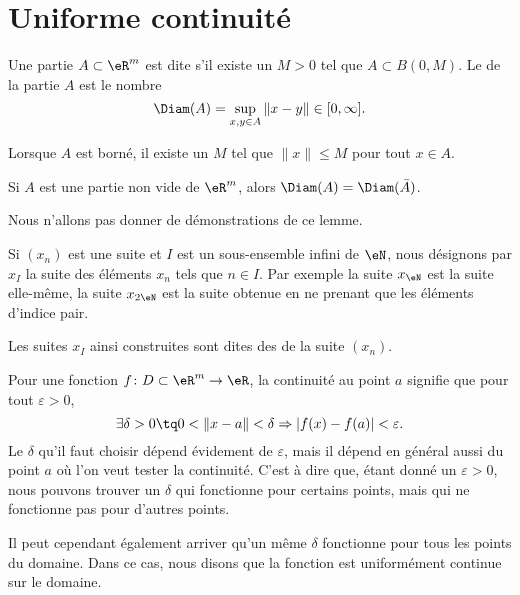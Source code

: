 \section{Uniforme continuité}		\label{SecUnifContinue}

\begin{definition}
	Une partie $A\subset\eR^m$ est dite  s'il existe un $M>0$ tel que $A\subset B(0,M)$. Le  de la partie $A$ est le nombre
	\begin{equation}
		\Diam(A)=\sup_{x,y\in A}\| x-y \|\in\mathopen[ 0 , \infty \mathclose].
	\end{equation}
\end{definition}
Lorsque $A$ est borné, il existe un $M$ tel que $\| x \|\leq M$ pour tout $x\in A$.

\begin{lemma}
	Si $A$ est une partie non vide de $\eR^m$, alors $\Diam(A)=\Diam(\bar A)$.
\end{lemma}
Nous n'allons pas donner de démonstrations de ce lemme.


Si $(x_n)$ est une suite et $I$ est un sous-ensemble infini de $\eN$, nous désignons par $x_I$ la suite des éléments $x_n$ tels que $n\in I$. Par exemple la suite $x_{\eN}$ est la suite elle-même, la suite $x_{2\eN}$ est la suite obtenue en ne prenant que les éléments d'indice pair.

Les suites $x_I$ ainsi construites sont dites des  de la suite $(x_n)$.


Pour une fonction $f\colon D\subset\eR^m\to \eR$, la continuité au point $a$ signifie que pour tout $\varepsilon>0$,
\begin{equation}
	\exists\delta>0\tq 0<\| x-a \|<\delta\Rightarrow | f(x)-f(a) |<\varepsilon.
\end{equation}
Le $\delta$ qu'il faut choisir dépend évidement de $\varepsilon$, mais il dépend en général aussi du point $a$ où l'on veut tester la continuité. C'est à dire que, étant donné un $\varepsilon>0$, nous pouvons trouver un $\delta$ qui fonctionne pour certains points, mais qui ne fonctionne pas pour d'autres points.

Il peut cependant également arriver qu'un même $\delta$ fonctionne pour tous les points du domaine. Dans ce cas, nous disons que la fonction est uniformément continue sur le domaine.

